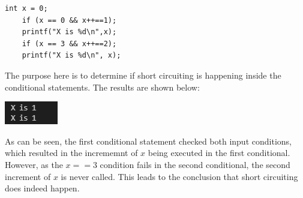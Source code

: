 \documentclass[12pt]{article}
\begin{document}
\begin{lstlisting}[style=CStyle]
    int x = 0;
    if (x == 0 && x++==1);
    printf("X is %d\n",x);
    if (x == 3 && x++==2);
    printf("X is %d\n", x);
\end{lstlisting}

The purpose here is to determine if short circuiting is happening inside the conditional statements.
The results are shown below:

\vspace{5mm}

\begin{center}
    \includegraphics{a5-bonus.png}
\end{center}

As can be seen, the first conditional statement checked both input conditions, which resulted in the incrememnt of $x$ being executed in the first conditional.
However, as the $x == 3$ condition fails in the second conditional, the second increment of $x$ is never called.
This leads to the conclusion that short circuiting does indeed happen.
\end{document}
